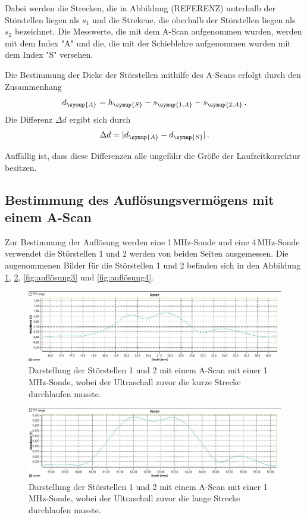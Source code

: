 Dabei werden die Strecken, die in Abbildung (REFERENZ) unterhalb der Störstellen liegen
als $s_1$ und die Strekcne, die oberhalb der Störstellen liegen als $s_2$ bezeichnet.
Die Messwerte, die mit dem A-Scan aufgenommen wurden, werden mit dem Index "A"
und die, die mit der Schieblehre aufgenommen wurden mit dem Index "S" versehen.

Die Bestimmung der Dicke der Störstellen mithilfe des A-Scans erfolgt durch den
Zusammenhang
\begin{equation}
  d_{\symup{A}}=h_{\symup{S}}-s_{\symup{1,A}}-s_{\symup{2,A}} \,.
\end{equation}
Die Differenz $\Delta d$ ergibt sich durch
\begin{equation}
  \Delta d=|d_{\symup{A}}-d_{\symup{S}}| \,.
\end{equation}

Auffällig ist, dass diese Differenzen alle ungefähr die Größe der Laufzeitkorrektur
besitzen.

\subsection{Bestimmung des Auflösungsvermögens mit einem A-Scan}
\label{subsec:A_scan_auflösung}

Zur Bestimmung der Auflösung werden eine 1\,MHz-Sonde und eine 4\,MHz-Sonde verwendet die
Störstellen 1 und 2 werden von beiden Seiten ausgemessen.
Die augenommenen Bilder für die Störstellen 1 und 2 befinden sich in den Abbildung \ref{fig:auflösung1},
\ref{fig:auflösung2}, \ref{fig:auflösung3} und \ref{fig:auflösung4}.

\begin{figure}[H]
  \centering
  \includegraphics[width=\textwidth]{data/1mhzdoppelteFehlstellekurzelLaufzeitGedrehtwieinZeichnung.jpeg}
  \caption{Darstellung der Störstellen 1 und 2 mit einem A-Scan mit einer 1\,MHz-Sonde, wobei der Ultraschall
  zuvor die kurze Strecke durchlaufen musste.}
  \label{fig:auflösung1}
\end{figure}

\begin{figure}[H]
  \centering
  \includegraphics[width=\textwidth]{data/1mhzdoppelteFehlstellelangeLaufzeit.jpg}
  \caption{Darstellung der Störstellen 1 und 2 mit einem A-Scan mit einer 1\,MHz-Sonde, wobei der Ultraschall
  zuvor die lange Strecke durchlaufen musste.}
  \label{fig:auflösung2}
\end{figure}


